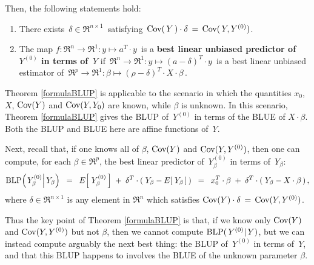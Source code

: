 \begin{theorem}
Then, the following statements hold:
\begin{enumerate}
\item
	There exists \,$\delta \in \Re^{n \times 1}$\, satisfying \,$\textnormal{Cov}(\,Y\,) \cdot \delta \,=\, \textnormal{Cov}(\,Y,Y^{(0)})$.
\item
	The map $f : \Re^{n} \longrightarrow \Re^{1} : y \longmapsto a^{T} \cdot y$\,
	is a \textbf{\color{red}best linear unbiased predictor of \,$Y^{(0)}$ in terms of \,$Y$} if
	\,$\Re^{n} \longrightarrow \Re^{1} : y \longmapsto (a - \delta)^{T} \cdot y$\,
	is a best linear unbiased estimator of 
	\,$\Re^{p} \longrightarrow \Re^{1} : \beta \longmapsto (\rho - \delta)^{T} \cdot X \cdot \beta$\,.
\end{enumerate}
\end{theorem}

\begin{remark}
\mbox{}
\vskip 0.05cm
\noindent
Theorem \ref{formulaBLUP} is applicable to the scenario in which
the quantities $x_{0}$, $X$, $\textnormal{Cov}(Y)$ and $\textnormal{Cov}(Y,Y_{0})$ are {\color{red}known}, while
{\color{red}$\beta$ is unknown}.
In this scenario, Theorem \ref{formulaBLUP} gives the BLUP of
\,$Y^{(0)}$ in terms of the BLUE of $X\cdot\beta$.
Both the BLUP and BLUE here are affine functions of \,$Y$.

Next, recall that, if one knows all of $\beta$, $\textnormal{Cov}(Y)$ and $\textnormal{Cov}(Y,Y^{(0)})$,
then one can compute, for each $\beta\in\Re^{p}$,
the {\color{red}best linear predictor of \,$Y^{(0)}_{\beta}$ in terms of \,$Y_{\beta}$}:
\begin{equation*}
\textnormal{BLP}\!\left(\left.Y^{(0)}_{\beta}\right\vert Y_{\beta}\right)
\;\; = \;\;
	E\!\left[\;Y^{(0)}_{\beta}\,\right] \; + \; \delta^{T}\cdot(\;Y_{\beta} - E\!\left[\;Y_{\beta}\,\right]\,)
\;\; = \;\;
	x_{0}^{T}\cdot\beta \; + \; \delta^{T}\cdot(\;Y_{\beta} - X\cdot\beta\,)\,,
\end{equation*}
where $\delta \in \Re^{n \times 1}$ is any element in $\Re^{n}$ which satisfies
$\textnormal{Cov}(Y) \cdot \delta \,=\, \textnormal{Cov}(Y,Y^{(0)})$.

Thus the key point of Theorem \ref{formulaBLUP} is that,
if we know only $\textnormal{Cov}(Y)$ and $\textnormal{Cov}(Y,Y^{(0)})$ but not $\beta$, then we cannot
compute $\textnormal{BLP}(\,Y^{(0)}\vert\,Y)$, but we can instead compute arguably the next best thing:
the BLUP of \,$Y^{(0)}$ in terms of \,$Y$, and that this BLUP happens to involves
the BLUE of the unknown parameter $\beta$.
\end{remark}

